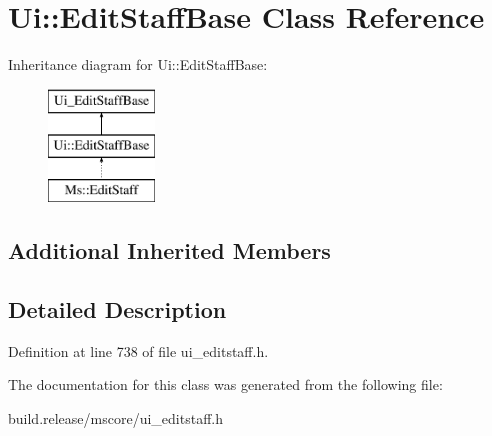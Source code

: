 \hypertarget{class_ui_1_1_edit_staff_base}{}\section{Ui\+:\+:Edit\+Staff\+Base Class Reference}
\label{class_ui_1_1_edit_staff_base}
Inheritance diagram for Ui\+:\+:Edit\+Staff\+Base\+:\begin{figure}[H]
\begin{center}
\leavevmode
\includegraphics[height=3.000000cm]{class_ui_1_1_edit_staff_base}
\end{center}
\end{figure}
\subsection*{Additional Inherited Members}


\subsection{Detailed Description}


Definition at line 738 of file ui\+\_\+editstaff.\+h.



The documentation for this class was generated from the following file\+:\begin{DoxyCompactItemize}
\item 
build.\+release/mscore/ui\+\_\+editstaff.\+h\end{DoxyCompactItemize}
